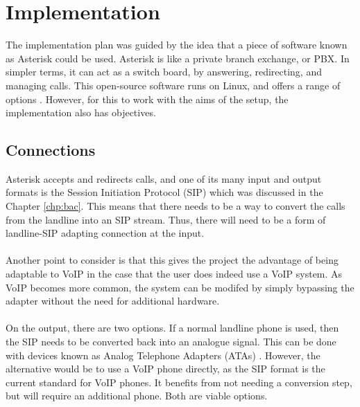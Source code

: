 \documentclass[main.tex]{subfiles}
\begin{document}
\section{Implementation}
The implementation plan was guided by the idea that a piece of software known as Asterisk could be used. Asterisk is like a private branch exchange, or PBX. In simpler terms, it can act as a switch board, by answering, redirecting, and managing calls. This open-source software runs on Linux, and offers a range of options \cite{asterisk-story}. However, for this to work with the aims of the setup, the implementation also has objectives.

\subsection{Connections}
Asterisk accepts and redirects calls, and one of its many input and output formats is the Session Initiation Protocol (SIP) \cite{sip} which was discussed in the Chapter \ref{chp:bac}. This means that there needs to be a way to convert the calls from the landline into an SIP stream. Thus, there will need to be a form of landline-SIP adapting connection at the input.
\\\\
Another point to consider is that this gives the project the advantage of being adaptable to VoIP in the case that the user does indeed use a VoIP system. As VoIP becomes more common, the system can be modifed by simply bypassing the adapter without the need for additional hardware.
\\\\
On the output, there are two options. If a normal landline phone is used, then the SIP needs to be converted back into an analogue signal. This can be done with devices known as Analog Telephone Adapters (ATAs) \cite{ata}. However, the alternative would be to use a VoIP phone directly, as the SIP format is the current standard for VoIP phones. It benefits from not needing a conversion step, but will require an additional phone. Both are viable options.
\end{document}
